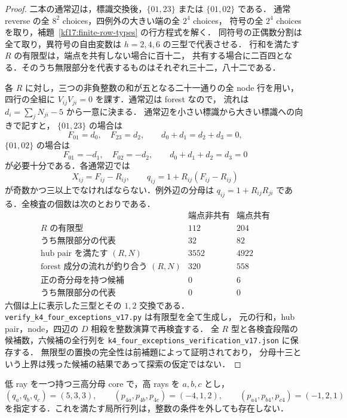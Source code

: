 \begin{proof}
二本の通常辺は，標識交換後，$\{01,23\}$ または $\{01,02\}$ である．
通常 reverse の全 $8^2$ choices，四例外の大きい端の全 $2^4$ choices，
符号の全 $2^4$ choices を取り，補題~\ref{kf17:finite-row-types} の行方程式を解く．
同符号の正偶数分割は全て取り，異符号の自由変数は $h=2,4,6$ の三型で代表させる．
行和を満たす $R$ の有限型は，端点を共有しない場合に百十二，
共有する場合に二百四となる．そのうち無限部分を代表するものはそれぞれ三十二，八十二である．

各 $R$ に対し，三つの非負整数の和が五となる二十一通りの全 node 行を用い，
四行の全組に $V_{ij}V_{ji}=0$ を課す．通常辺は forest なので，
流れは $d_i=\sum_jN_{ji}-5$ から一意に決まる．
通常辺を小さい標識から大きい標識への向きで記すと，
$\{01,23\}$ の場合は
\[
 F_{01}=d_0,\quad F_{23}=d_2,\qquad d_0+d_1=d_2+d_3=0,
\]
$\{01,02\}$ の場合は
\[
 F_{01}=-d_1,\quad F_{02}=-d_2,\qquad d_0+d_1+d_2=d_3=0
\]
が必要十分である．各通常辺では
\begin{equation}\label{kf17:recover-q}
 X_{ij}=F_{ij}-R_{ij},\qquad
 q_{ij}=1+R_{ij}(F_{ij}-R_{ij})
\end{equation}
が奇数かつ三以上でなければならない．例外辺の分母は
$q_{ij}=1+R_{ij}R_{ji}$ である．全検査の個数は次のとおりである．
\[
\begin{array}{c|rr}
 &\text{端点非共有}&\text{端点共有}\\\hline
 R\text{ の有限型}&112&204\\
 \text{うち無限部分の代表}&32&82\\
 \text{hub pair を満たす }(R,N)&3552&4922\\
 \text{forest 成分の流れが釣り合う }(R,N)&320&558\\
 \text{正の奇分母を持つ候補}&0&6\\
 \text{うち無限部分の代表}&0&0
\end{array}
\]
六個は上に表示した三型とその $1,2$ 交換である．
\nolinkurl{verify_k4_four_exceptions_v17.py} は有限型を全て生成し，
元の行和，hub pair，node，四辺の $D$ 相殺を整数演算で再検査する．
全 $R$ 型と各検査段階の候補数，六候補の全行列を
\nolinkurl{k4_four_exceptions_verification_v17.json} に保存する．
無限型の置換の完全性は前補題によって証明されており，
分母十三という上界は残った候補の結果であって探索の仮定ではない．
\end{proof}

\begin{lemma}[残存候補に共通する実数局所障害]
\label{kf17:negative-discriminant}
低 ray を一つ持つ三高分母 core で，高 rays を $a,b,c$ とし，
\[
 (q_a,q_b,q_c)=(5,3,3),\qquad
 (p_{4a},p_{4b},p_{4c})=(-4,1,2),\qquad
 (p_{a4},p_{b4},p_{c4})=(-1,2,1)
\]
を指定する．これを満たす局所行列は，整数の条件を外しても存在しない．
\end{lemma}

